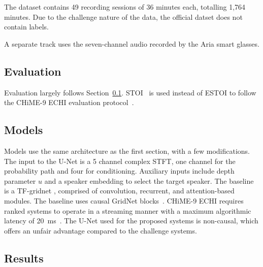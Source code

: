 The dataset contains 49 recording sessions of 36 minutes each, totalling 1,764 minutes. Due to the challenge nature of the data, the official datset does not contain labels.

A separate track uses the seven-channel audio recorded by the Aria smart glasses.

\subsection{Evaluation}
\label{sec:cfmse-vbdmd-evaluation}
Evaluation largely follows Section~\ref{sec:cfmse-vbdmd-evaluation}. \ac{STOI}~\citep{taal2011stoi} is used instead of \ac{ESTOI} to follow the CHiME-9 ECHI evaluation protocol~\citep{chime9ECHIRules}. 

\subsection{Models}
Models use the same architecture as the first section, with a few modifications. The input to the U-Net is a 5 channel complex \ac{STFT}, one channel for the probability path and four for conditioning. Auxiliary inputs include depth parameter $u$ and a speaker embedding to select the target speaker. The baseline is a TF-gridnet \citep{chime9,gridnet}, comprised of convolution, recurrent, and attention-based modules. The baseline uses causal GridNet blocks~\citep{chime9ECHIBaseline}. CHiME-9 ECHI requires ranked systems to operate in a streaming manner with a maximum algorithmic latency of 20~ms~\citep{chime9ECHIRules}. The U-Net used for the proposed systems is non-causal, which offers an unfair advantage compared to the challenge systems.

\subsection{Results}

